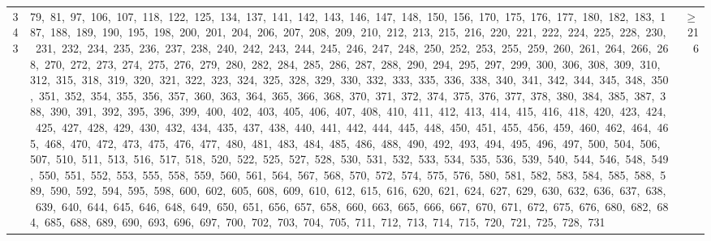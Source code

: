 \begin{longtable}{c|p{}|r}
343 & 79,\ 81,\ 97,\ 106,\ 107,\ 118,\ 122,\ 125,\ 134,\ 137,\ 141,\ 142,\ 143,\ 146,\ 147,\ 148,\ 150,\ 156,\ 170,\ 175,\ 176,\ 177,\ 180,\ 182,\ 183,\ 187,\ 188,\ 189,\ 190,\ 195,\ 198,\ 200,\ 201,\ 204,\ 206,\ 207,\ 208,\ 209,\ 210,\ 212,\ 213,\ 215,\ 216,\ 220,\ 221,\ 222,\ 224,\ 225,\ 228,\ 230,\ 231,\ 232,\ 234,\ 235,\ 236,\ 237,\ 238,\ 240,\ 242,\ 243,\ 244,\ 245,\ 246,\ 247,\ 248,\ 250,\ 252,\ 253,\ 255,\ 259,\ 260,\ 261,\ 264,\ 266,\ 268,\ 270,\ 272,\ 273,\ 274,\ 275,\ 276,\ 279,\ 280,\ 282,\ 284,\ 285,\ 286,\ 287,\ 288,\ 290,\ 294,\ 295,\ 297,\ 299,\ 300,\ 306,\ 308,\ 309,\ 310,\ 312,\ 315,\ 318,\ 319,\ 320,\ 321,\ 322,\ 323,\ 324,\ 325,\ 328,\ 329,\ 330,\ 332,\ 333,\ 335,\ 336,\ 338,\ 340,\ 341,\ 342,\ 344,\ 345,\ 348,\ 350,\ 351,\ 352,\ 354,\ 355,\ 356,\ 357,\ 360,\ 363,\ 364,\ 365,\ 366,\ 368,\ 370,\ 371,\ 372,\ 374,\ 375,\ 376,\ 377,\ 378,\ 380,\ 384,\ 385,\ 387,\ 388,\ 390,\ 391,\ 392,\ 395,\ 396,\ 399,\ 400,\ 402,\ 403,\ 405,\ 406,\ 407,\ 408,\ 410,\ 411,\ 412,\ 413,\ 414,\ 415,\ 416,\ 418,\ 420,\ 423,\ 424,\ 425,\ 427,\ 428,\ 429,\ 430,\ 432,\ 434,\ 435,\ 437,\ 438,\ 440,\ 441,\ 442,\ 444,\ 445,\ 448,\ 450,\ 451,\ 455,\ 456,\ 459,\ 460,\ 462,\ 464,\ 465,\ 468,\ 470,\ 472,\ 473,\ 475,\ 476,\ 477,\ 480,\ 481,\ 483,\ 484,\ 485,\ 486,\ 488,\ 490,\ 492,\ 493,\ 494,\ 495,\ 496,\ 497,\ 500,\ 504,\ 506,\ 507,\ 510,\ 511,\ 513,\ 516,\ 517,\ 518,\ 520,\ 522,\ 525,\ 527,\ 528,\ 530,\ 531,\ 532,\ 533,\ 534,\ 535,\ 536,\ 539,\ 540,\ 544,\ 546,\ 548,\ 549,\ 550,\ 551,\ 552,\ 553,\ 555,\ 558,\ 559,\ 560,\ 561,\ 564,\ 567,\ 568,\ 570,\ 572,\ 574,\ 575,\ 576,\ 580,\ 581,\ 582,\ 583,\ 584,\ 585,\ 588,\ 589,\ 590,\ 592,\ 594,\ 595,\ 598,\ 600,\ 602,\ 605,\ 608,\ 609,\ 610,\ 612,\ 615,\ 616,\ 620,\ 621,\ 624,\ 627,\ 629,\ 630,\ 632,\ 636,\ 637,\ 638,\ 639,\ 640,\ 644,\ 645,\ 646,\ 648,\ 649,\ 650,\ 651,\ 656,\ 657,\ 658,\ 660,\ 663,\ 665,\ 666,\ 667,\ 670,\ 671,\ 672,\ 675,\ 676,\ 680,\ 682,\ 684,\ 685,\ 688,\ 689,\ 690,\ 693,\ 696,\ 697,\ 700,\ 702,\ 703,\ 704,\ 705,\ 711,\ 712,\ 713,\ 714,\ 715,\ 720,\ 721,\ 725,\ 728,\ 731 & $\ge$ 216 \\

\end{longtable}
